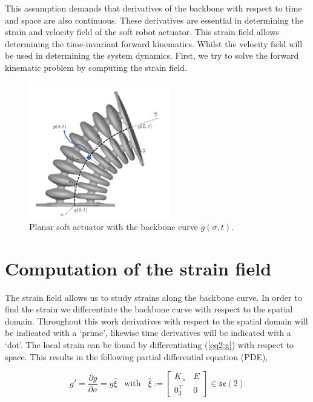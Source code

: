 This assumption demands that derivatives of the backbone with respect to time and space are also continuous. These derivatives are essential in determining the strain and velocity field of the soft robot actuator. This strain field allows determining the time-invariant forward kinematics. Whilst the velocity field will be used in determining the system dynamics. First, we try to solve the forward kinematic problem by computing the strain field.



\begin{figure}[H]
    \centering
    \includegraphics[width=0.55\textwidth]{Figures/Chapter2/actuatorschematic.png}
    \caption{Planar soft actuator with the backbone curve $g(\sigma,t)$.}
    \label{fig2:kinematicschematic}
\end{figure}


\section{Computation of the strain field}

The strain field allows us to study strains along the backbone curve. In order to find the strain we differentiate the backbone curve with respect to the spatial domain. Throughout this work derivatives with respect to the spatial domain will be indicated with a `prime', likewise time derivatives will be indicated with a `dot'. The local strain can be found by differentiating (\ref{eq2:g}) with respect to space. This results in the following partial differential equation (PDE), 

\begin{equation}
   g' = \frac{\partial g}{\partial \sigma} = g \hat{\xi} \hspace{10pt} \text{with} \hspace{10pt}  \hat{\xi} := \begin{bmatrix} K_\times & E \\ 0_3^\top & 0 \end{bmatrix} \in  \mathfrak{se}(2)
    \label{eq2:dgdsigma}
\end{equation}

